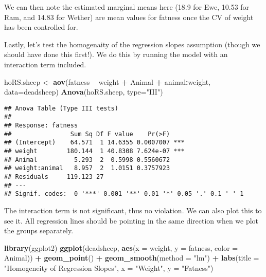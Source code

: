 \documentclass[]{book}
\newenvironment{Shaded}{\begin{snugshade}}{\end{snugshade}}
\newcommand{\KeywordTok}[1]{\textcolor[rgb]{0.13,0.29,0.53}{\textbf{#1}}}
\newcommand{\DataTypeTok}[1]{\textcolor[rgb]{0.13,0.29,0.53}{#1}}
\newcommand{\StringTok}[1]{\textcolor[rgb]{0.31,0.60,0.02}{#1}}
\newcommand{\OperatorTok}[1]{\textcolor[rgb]{0.81,0.36,0.00}{\textbf{#1}}}
\newcommand{\NormalTok}[1]{#1}
\theoremstyle{definition}
\theoremstyle{definition}
\theoremstyle{definition}
\theoremstyle{remark}
\begin{document}
We can then note the estimated marginal means here (18.9 for Ewe, 10.53
for Ram, and 14.83 for Wether) are mean values for fatness once the CV
of weight has been controlled for.

Lastly, let's test the homogenaity of the regression slopes assumption
(though we should have done this first!). We do this by running the
model with an interaction term included.

\begin{Shaded}
\begin{Highlighting}[]
\NormalTok{hoRS.sheep <-}\StringTok{ }\KeywordTok{aov}\NormalTok{(fatness }\OperatorTok{~}\StringTok{ }\NormalTok{weight }\OperatorTok{+}\StringTok{ }\NormalTok{Animal }\OperatorTok{+}\StringTok{ }\NormalTok{animal}\OperatorTok{:}\NormalTok{weight, }\DataTypeTok{data=}\NormalTok{deadsheep)}
\KeywordTok{Anova}\NormalTok{(hoRS.sheep, }\DataTypeTok{type=}\StringTok{"III"}\NormalTok{)}
\end{Highlighting}
\end{Shaded}

\begin{verbatim}
## Anova Table (Type III tests)
## 
## Response: fatness
##                Sum Sq Df F value    Pr(>F)    
## (Intercept)    64.571  1 14.6355 0.0007007 ***
## weight        180.144  1 40.8308 7.624e-07 ***
## Animal          5.293  2  0.5998 0.5560672    
## weight:animal   8.957  2  1.0151 0.3757923    
## Residuals     119.123 27                      
## ---
## Signif. codes:  0 '***' 0.001 '**' 0.01 '*' 0.05 '.' 0.1 ' ' 1
\end{verbatim}

The interaction term is not significant, thus no violation. We can also
plot this to see it. All regression lines should be pointing in the same
direction when we plot the groups separately.

\begin{Shaded}
\begin{Highlighting}[]
\KeywordTok{library}\NormalTok{(ggplot2)}
\KeywordTok{ggplot}\NormalTok{(deadsheep, }\KeywordTok{aes}\NormalTok{(}\DataTypeTok{x =}\NormalTok{ weight, }\DataTypeTok{y =}\NormalTok{ fatness, }\DataTypeTok{color =}\NormalTok{ Animal)) }\OperatorTok{+}\StringTok{ }
\StringTok{  }\KeywordTok{geom_point}\NormalTok{() }\OperatorTok{+}\StringTok{ }
\StringTok{  }\KeywordTok{geom_smooth}\NormalTok{(}\DataTypeTok{method =} \StringTok{"lm"}\NormalTok{) }\OperatorTok{+}\StringTok{ }
\StringTok{  }\KeywordTok{labs}\NormalTok{(}\DataTypeTok{title =} \StringTok{"Homogeneity of Regression Slopes"}\NormalTok{, }\DataTypeTok{x =} \StringTok{"Weight"}\NormalTok{, }\DataTypeTok{y =} \StringTok{"Fatness"}\NormalTok{)}
\end{Highlighting}
\end{Shaded}
\end{document}
